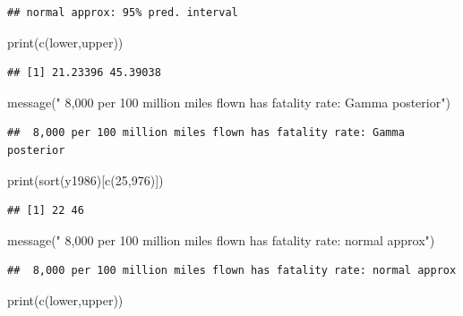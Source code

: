 \documentclass[
]{book}
\newenvironment{Shaded}{\begin{snugshade}}{\end{snugshade}}
\newcommand{\DecValTok}[1]{\textcolor[rgb]{0.00,0.00,0.81}{#1}}
\newcommand{\FunctionTok}[1]{\textcolor[rgb]{0.00,0.00,0.00}{#1}}
\newcommand{\NormalTok}[1]{#1}
\newcommand{\StringTok}[1]{\textcolor[rgb]{0.31,0.60,0.02}{#1}}
\theoremstyle{definition}
\theoremstyle{definition}
\theoremstyle{definition}
\theoremstyle{definition}
\theoremstyle{remark}
\begin{document}
\begin{verbatim}
## normal approx: 95% pred. interval
\end{verbatim}

\begin{Shaded}
\begin{Highlighting}[]
 \FunctionTok{print}\NormalTok{(}\FunctionTok{c}\NormalTok{(lower,upper))}
\end{Highlighting}
\end{Shaded}

\begin{verbatim}
## [1] 21.23396 45.39038
\end{verbatim}

\begin{Shaded}
\begin{Highlighting}[]
 \FunctionTok{message}\NormalTok{(}\StringTok{" 8,000 per 100 million miles flown has fatality rate: Gamma posterior"}\NormalTok{)}
\end{Highlighting}
\end{Shaded}

\begin{verbatim}
##  8,000 per 100 million miles flown has fatality rate: Gamma posterior
\end{verbatim}

\begin{Shaded}
\begin{Highlighting}[]
 \FunctionTok{print}\NormalTok{(}\FunctionTok{sort}\NormalTok{(y1986)[}\FunctionTok{c}\NormalTok{(}\DecValTok{25}\NormalTok{,}\DecValTok{976}\NormalTok{)])}
\end{Highlighting}
\end{Shaded}

\begin{verbatim}
## [1] 22 46
\end{verbatim}

\begin{Shaded}
\begin{Highlighting}[]
 \FunctionTok{message}\NormalTok{(}\StringTok{" 8,000 per 100 million miles flown has fatality rate: normal approx"}\NormalTok{)}
\end{Highlighting}
\end{Shaded}

\begin{verbatim}
##  8,000 per 100 million miles flown has fatality rate: normal approx
\end{verbatim}

\begin{Shaded}
\begin{Highlighting}[]
 \FunctionTok{print}\NormalTok{(}\FunctionTok{c}\NormalTok{(lower,upper))}
\end{Highlighting}
\end{Shaded}
\end{document}

